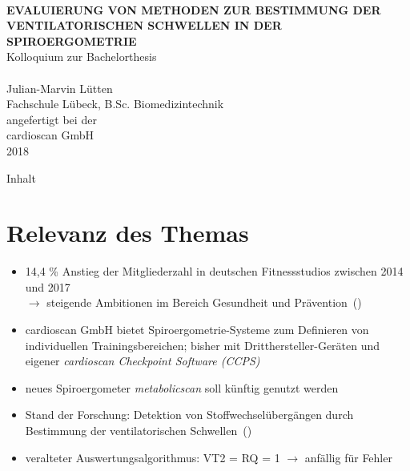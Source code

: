 \documentclass[colorBG,slideColor,8pt]{beamer}
\newcommand{\talktitle}{Evaluierung von Methoden zur Bestimmung der ventilatorischen Schwellen in der Spiroergometrie}
\begin{document}
\begin{frame}
    \vspace{-10ex}
    \textcolor{fhlred}{\HRuleFill[0.4ex]} \\ \vspace{1ex}
    {\linespread{1.5}\selectfont
    \MakeUppercase{\bf \huge \talktitle}\\[5.5ex]}
    \normalsize Kolloquium zur Bachelorthesis\\
    \textcolor{fhlred}{\HRuleFill[0.1ex]} \\ \vspace{4ex}
    \small Julian-Marvin Lütten\\
    \small Fachschule Lübeck, B.Sc. Biomedizintechnik\\
    \vspace{2ex}
    \small angefertigt bei der\\
    \small cardioscan GmbH\\
    \small 2018
\end{frame}

\begin{frame}{Inhalt}
\tableofcontents
\end{frame}


\section{Relevanz des Themas}

\begin{frame}
\begin{itemize}
	\item 14,4 \% Anstieg der Mitgliederzahl in deutschen Fitnessstudios zwischen 2014 und 2017\\$\rightarrow$ steigende Ambitionen im Bereich Gesundheit und Prävention~(\cite{DSSV.2018})
	\item cardioscan GmbH bietet Spiroergometrie-Systeme zum Definieren von individuellen Trainingsbereichen; bisher mit Dritthersteller-Geräten und eigener \textsl{cardioscan Checkpoint Software (CCPS)}
	\item neues Spiroergometer \textsl{metabolicscan} soll künftig genutzt werden
	\item Stand der Forschung: Detektion von Stoffwechselübergängen durch Bestimmung der ventilatorischen Schwellen~(\cite{Westhoff.2012})
	\item veralteter Auswertungsalgorithmus: VT2 = RQ = 1 $\rightarrow$ anfällig für Fehler
\end{itemize}
\end{frame}
\end{document}
